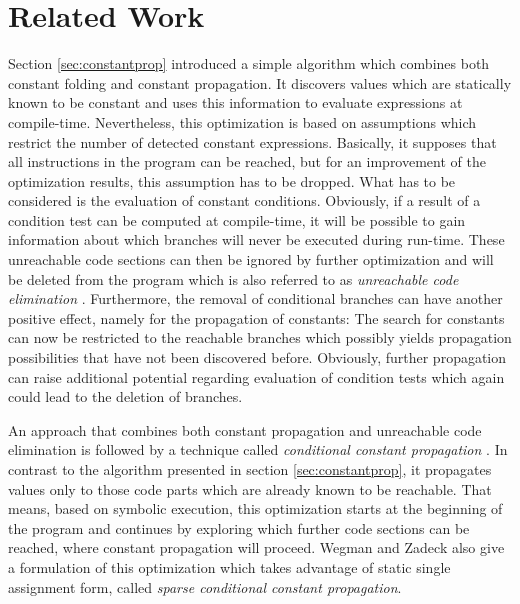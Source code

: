 \section{Related Work}
\label{sec:related}

Section \ref{sec:constantprop} introduced a simple algorithm which combines both constant folding and constant propagation. It discovers values which are statically known to be constant and uses this information to evaluate expressions at compile-time. Nevertheless, this optimization is based on assumptions which restrict the number of detected constant expressions. Basically, it supposes that all instructions in the program can be reached, but for an improvement of the optimization results, this assumption has to be dropped. What has to be considered is the evaluation of constant conditions. Obviously, if a result of a condition test can be computed at compile-time, it will be possible to gain information about which branches will never be executed during run-time. These unreachable code sections can then be ignored by further optimization and will be deleted from the program which is also referred to as \emph{unreachable code elimination} \cite{appel:2004:moderncompilerimpl}. Furthermore, the removal of conditional branches can have another positive effect, namely for the propagation of constants: The search for constants can now be restricted to the reachable branches which possibly yields propagation possibilities that have not been discovered before. Obviously, further propagation can raise additional potential regarding evaluation of condition tests which again could lead to the deletion of branches.

An approach  that combines both constant propagation and unreachable code elimination is followed by a technique called \emph{conditional constant propagation} \cite{wegman:1991:constantpropagation}. In contrast to the algorithm presented in section \ref{sec:constantprop}, it propagates values only to those code parts which are already known to be reachable. That means, based on symbolic execution, this optimization starts at the beginning of the program and continues by exploring which further code sections can be reached, where constant propagation will proceed. Wegman and Zadeck \cite{wegman:1991:constantpropagation} also give a formulation of this optimization which takes advantage of static single assignment form, called \emph{sparse conditional constant propagation}.

